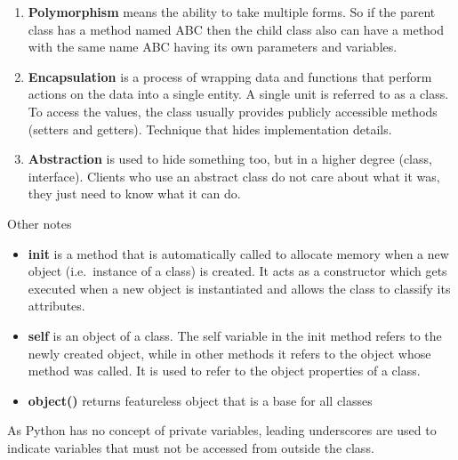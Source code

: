 \documentclass[
  letterpaper,
]{book}
\providecommand{\tightlist}{%
  \setlength{\itemsep}{0pt}\setlength{\parskip}{0pt}}\usepackage{longtable,booktabs,array}
\begin{document}
\begin{enumerate}
\def\labelenumi{\alph{enumi})}
\setcounter{enumi}{1}
\tightlist
\item
  \textbf{Polymorphism} means the ability to take multiple forms. So if
  the parent class has a method named ABC then the child class also can
  have a method with the same name ABC having its own parameters and
  variables.
\item
  \textbf{Encapsulation} is a process of wrapping data and functions
  that perform actions on the data into a single entity. A single unit
  is referred to as a class. To access the values, the class usually
  provides publicly accessible methods (setters and getters). Technique
  that hides implementation details.
\item
  \textbf{Abstraction} is used to hide something too, but in a higher
  degree (class, interface). Clients who use an abstract class do not
  care about what it was, they just need to know what it can do.
\end{enumerate}

Other notes

\begin{itemize}
\tightlist
\item
  \textbf{\textbf{init}} is a method that is automatically called to
  allocate memory when a new object (i.e.~instance of a class) is
  created. It acts as a constructor which gets executed when a new
  object is instantiated and allows the class to classify its
  attributes.
\item
  \textbf{self} is an object of a class. The self variable in the init
  method refers to the newly created object, while in other methods it
  refers to the object whose method was called. It is used to refer to
  the object properties of a class.
\item
  \textbf{object()} returns featureless object that is a base for all
  classes
\end{itemize}

\begin{tcolorbox}[enhanced jigsaw, arc=.35mm, bottomtitle=1mm, opacitybacktitle=0.6, bottomrule=.15mm, toptitle=1mm, title=\textcolor{quarto-callout-note-color}{\faInfo}\hspace{0.5em}{Note}, colbacktitle=quarto-callout-note-color!10!white, toprule=.15mm, colback=white, opacityback=0, rightrule=.15mm, breakable, titlerule=0mm, left=2mm, leftrule=.75mm, colframe=quarto-callout-note-color-frame, coltitle=black]

As Python has no concept of private variables, leading underscores are
used to indicate variables that must not be accessed from outside the
class.

\end{tcolorbox}
\end{document}

